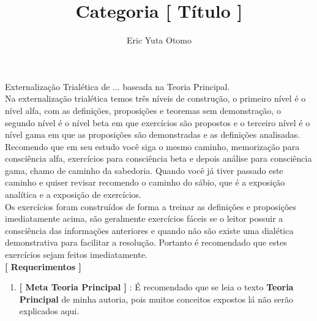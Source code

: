 \documentclass[10pt,a4paper]{report}
\begin{document}
	

	
\title{Categoria [ Título ]}
\author{Eric Yuta Otomo}
\maketitle

\tableofcontents


% 
\hspace{\baselineskip}

Externalização Trialética de ... baseada na Teoria Principal. \\

Na externalização trialética temos três níveis de construção, o primeiro nível é o nível alfa, com as definições, proposições e teoremas sem demonstração, o segundo nível é o nível beta em que exercícios são propostos e o terceiro nível é o nível gama em que as proposições são demonstradas e as definições analisadas.
Recomendo que em seu estudo você siga o mesmo caminho, memorização para consciência alfa, exercícios para consciência beta e depois análise para consciência gama, chamo de caminho da sabedoria. Quando você já tiver passado este caminho e quiser revisar recomendo o caminho do sábio, que é a exposição analítica e a exposição de exercícios. \\

Os exercícios foram construídos de forma a treinar as definições e proposições imediatamente acima, são geralmente exercícios fáceis se o leitor possuir a consciência das informações anteriores e quando não são existe uma dialética demonstrativa para facilitar a resolução. Portanto é recomendado que estes exercícios sejam feitos imediatamente.\\

\textbf{[ Requerimentos ]}

\begin{enumerate}
	\item \textbf{[ Meta Teoria Principal ]} : É recomendado que se leia o texto \textbf{Teoria Principal} de minha autoria, pois muitos conceitos expostos lá não serão explicados aqui.
\end{enumerate}
\end{document}
